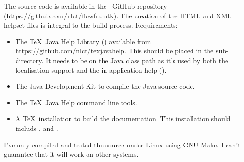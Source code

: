 The source code is available in the \FlowframTk\ GitHub repository
(\url{https://github.com/nlct/flowframtk}).
The creation of the HTML and XML helpset files is integral to the 
build process.
Requirements:
\begin{itemize}
\item The \TeX\ Java Help Library ()
available from \url{https://github.com/nlct/texjavahelp}.
This should be placed in the  sub-directory.
It needs to be on the Java class path as it's used by both the
localisation support and the in-application help ().
 
\item The Java Development Kit to compile the Java source code.

\item The \TeX\ Java Help command line tools.

\item A \TeX\ installation to build the documentation.
This installation should include ,
 and .
\end{itemize}

I've only compiled and tested the source under Linux using GNU Make.
I can't guarantee that it will work on other systems.

